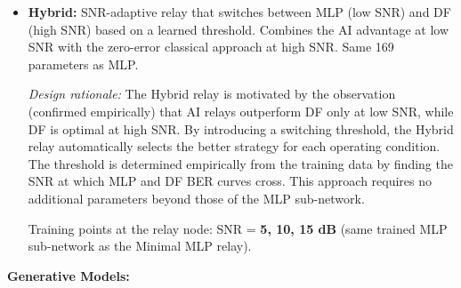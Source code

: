 \begin{itemize}
\item
  \textbf{Hybrid:} SNR-adaptive relay that switches between MLP (low SNR) and DF (high SNR) based on a learned threshold. Combines the AI advantage at low SNR with the zero-error classical approach at high SNR. Same 169 parameters as MLP.

  \emph{Design rationale:} The Hybrid relay is motivated by the observation (confirmed empirically) that AI relays outperform DF only at low SNR, while DF is optimal at high SNR. By introducing a switching threshold, the Hybrid relay automatically selects the better strategy for each operating condition. The threshold is determined empirically from the training data by finding the SNR at which MLP and DF BER curves cross. This approach requires no additional parameters beyond those of the MLP sub-network.

  Training points at the relay node: SNR = \textbf{5, 10, 15 dB} (same trained MLP sub-network as the Minimal MLP relay).
\end{itemize}

\textbf{Generative Models:}

